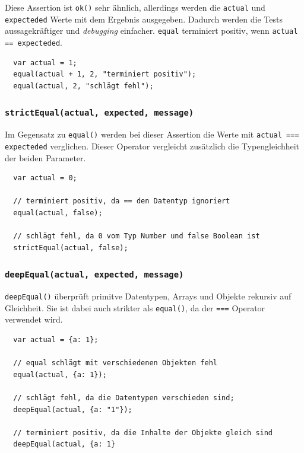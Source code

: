 \documentclass[11pt, a4paper]{article}
\begin{document}
Diese Assertion ist \texttt{ok()} sehr ähnlich, allerdings werden die
\texttt{actual} und \texttt{expecteded} Werte mit dem Ergebnis ausgegeben. Dadurch
werden die Tests aussagekräftiger und \emph{debugging} einfacher.
\texttt{equal} terminiert positiv, wenn \texttt{actual == expecteded}. 

\begin{verbatim}
  var actual = 1;
  equal(actual + 1, 2, "terminiert positiv");
  equal(actual, 2, "schlägt fehl");
\end{verbatim}

\subsubsection*{\texttt{strictEqual(actual, expected, message)}}

Im Gegensatz zu \texttt{equal()} werden bei dieser Assertion die Werte
mit \texttt{actual === expecteded} verglichen. Dieser Operator vergleicht
zusätzlich die Typengleichheit der beiden Parameter.

\begin{verbatim}
  var actual = 0;

  // terminiert positiv, da == den Datentyp ignoriert
  equal(actual, false);

  // schlägt fehl, da 0 vom Typ Number und false Boolean ist
  strictEqual(actual, false);
\end{verbatim}

\subsubsection*{\texttt{deepEqual(actual, expected, message)}}

\texttt{deepEqual()} überprüft primitve Datentypen, Arrays und Objekte
rekursiv auf Gleichheit. Sie ist dabei auch strikter als \texttt{equal()}, da
der \texttt{===} Operator verwendet wird.

\begin{verbatim}
  var actual = {a: 1};

  // equal schlägt mit verschiedenen Objekten fehl
  equal(actual, {a: 1});

  // schlägt fehl, da die Datentypen verschieden sind;
  deepEqual(actual, {a: "1"});

  // terminiert positiv, da die Inhalte der Objekte gleich sind
  deepEqual(actual, {a: 1}
\end{verbatim}
\end{document}
